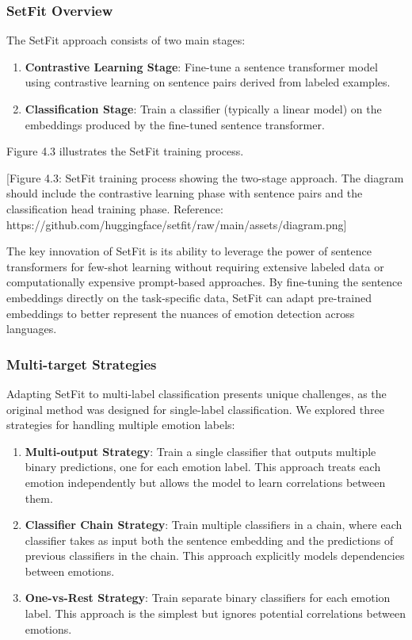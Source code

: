 \documentclass[a4paper,12pt]{extarticle}
\begin{document}
\subsubsection{SetFit Overview}

The SetFit approach consists of two main stages:

\begin{enumerate}
\item \textbf{Contrastive Learning Stage}: Fine-tune a sentence transformer model using contrastive learning on sentence pairs derived from labeled examples.
\item \textbf{Classification Stage}: Train a classifier (typically a linear model) on the embeddings produced by the fine-tuned sentence transformer.
\end{enumerate}

Figure 4.3 illustrates the SetFit training process.

[Figure 4.3: SetFit training process showing the two-stage approach. The diagram should include the contrastive learning phase with sentence pairs and the classification head training phase. Reference: https://github.com/huggingface/setfit/raw/main/assets/diagram.png]

The key innovation of SetFit is its ability to leverage the power of sentence transformers for few-shot learning without requiring extensive labeled data or computationally expensive prompt-based approaches. By fine-tuning the sentence embeddings directly on the task-specific data, SetFit can adapt pre-trained embeddings to better represent the nuances of emotion detection across languages.

\subsubsection{Multi-target Strategies}

Adapting SetFit to multi-label classification presents unique challenges, as the original method was designed for single-label classification. We explored three strategies for handling multiple emotion labels:

\begin{enumerate}
\item \textbf{Multi-output Strategy}: Train a single classifier that outputs multiple binary predictions, one for each emotion label. This approach treats each emotion independently but allows the model to learn correlations between them.

\item \textbf{Classifier Chain Strategy}: Train multiple classifiers in a chain, where each classifier takes as input both the sentence embedding and the predictions of previous classifiers in the chain. This approach explicitly models dependencies between emotions.

\item \textbf{One-vs-Rest Strategy}: Train separate binary classifiers for each emotion label. This approach is the simplest but ignores potential correlations between emotions.
\end{enumerate}
\end{document}

